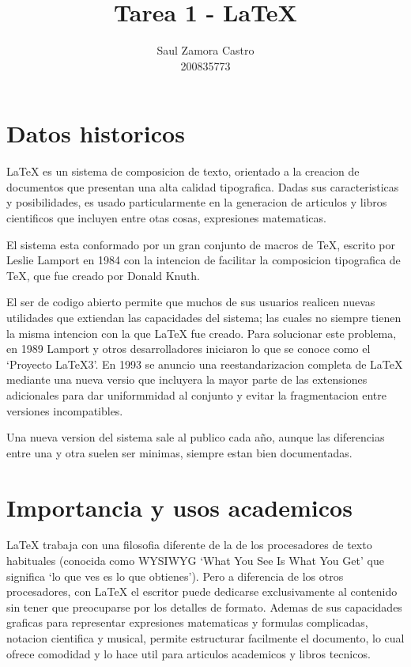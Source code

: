 \documentclass[11pt]{article}
\title{\textbf{Tarea 1 - \LaTeX{}}}
\author{Saul Zamora Castro\\200835773\\}
\date{}
\begin{document}
\maketitle

\section{Datos historicos}
\LaTeX{} es un sistema de composicion de texto, orientado a la creacion de documentos que presentan una alta calidad tipografica. Dadas sus caracteristicas y posibilidades, es usado particularmente en la generacion de articulos y libros cientificos que incluyen entre otas cosas, expresiones matematicas.

El sistema esta conformado por un gran conjunto de macros de TeX, escrito por Leslie Lamport en 1984 con la intencion de facilitar la composicion tipografica de TeX, que fue creado por Donald Knuth.

El ser de codigo abierto permite que muchos de sus usuarios realicen nuevas utilidades que extiendan las capacidades del sistema; las cuales no siempre tienen la misma intencion con la que \LaTeX{} fue creado. Para solucionar este problema, en 1989 Lamport y otros desarrolladores iniciaron lo que se conoce como el `Proyecto LaTeX3'. En 1993 se anuncio una reestandarizacion completa de \LaTeX{} mediante una nueva versio que incluyera la mayor parte de las extensiones adicionales para dar uniformmidad al conjunto y evitar la fragmentacion entre versiones incompatibles.

Una nueva version del sistema sale al publico cada año, aunque las diferencias entre una y otra suelen ser minimas, siempre estan bien documentadas.

\section{Importancia y usos academicos}
\LaTeX{} trabaja con una filosofia diferente de la de los procesadores de texto habituales (conocida como WYSIWYG `What You See Is What You Get' que significa `lo que ves es lo que obtienes'). Pero a diferencia de los otros procesadores, con \LaTeX{} el escritor puede dedicarse exclusivamente al contenido sin tener que preocuparse por los detalles de formato. Ademas de sus capacidades graficas para representar expresiones matematicas y formulas complicadas, notacion cientifica y musical, permite estructurar facilmente el documento, lo cual ofrece comodidad y lo hace util para articulos academicos y libros tecnicos.
\end{document}
